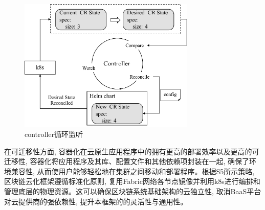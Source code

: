\begin{figure}[h] %
    \centering %
    \includegraphics[width=0.75\textwidth]{FIGs/chapter3/controller.pdf} %
    \caption{controller循环监听} %
    \label{controller} %
\end{figure}%

在可迁移性方面, 容器化在云原生应用程序中的拥有更高的部署效率\cite{zhou2021container}以及更高的可迁移性, 容器化将应用程序及其库、配置文件和其他依赖项封装在一起, 确保了环境兼容性, 从而使用户能够轻松地在集群之间移动和部署程序。根据S5所示策略, 区块链云化框架遵循标准化原则, 复用Fabric网络各节点镜像并利用k8s进行编排和管理底层的物理资源。这可以确保区块链系统基础架构的云独立性, 取消BaaS平台对云提供商的强依赖性, 提升本框架的的灵活性与通用性。





